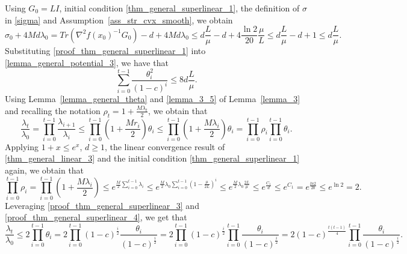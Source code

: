 \documentclass[11pt]{article}
\numberwithin{assumption}{section}
\numberwithin{remark}{section}
\numberwithin{theorem}{section}
\begin{document}
Using $G_0 = LI$, initial condition \eqref{thm_general_superlinear_1}, the definition of $\sigma$ in \eqref{sigma} and Assumption~\ref{ass_str_cvx_smooth}, we obtain
\begin{equation}\label{proof_thm_general_superlinear_1}
    \sigma_0 + 4Md\lambda_0 = Tr(\nabla^2{f(x_0)}^{-1}G_0) - d + 4Md\lambda_0 \leq d\frac{L}{\mu} - d + 4\frac{\ln{2}}{20}\frac{\mu}{L} \leq d\frac{L}{\mu} - d + 1 \leq d\frac{L}{\mu}.
\end{equation}
Substituting \eqref{proof_thm_general_superlinear_1} into \eqref{lemma_general_potential_3}, we have that
\begin{equation}\label{proof_thm_general_superlinear_2}
\sum_{i = 0}^{t - 1}\frac{\theta^2_i}{(1 - c)^i} \leq 8d\frac{L}{\mu}.
\end{equation}
Using Lemma~\ref{lemma_general_theta} and \eqref{lemma_3_5} of Lemma~\ref{lemma_3} and recalling the notation $\rho_t = 1 + \frac{M\lambda_t}{2}$, we obtain that
\begin{equation}\label{proof_thm_general_superlinear_3}
\frac{\lambda_t}{\lambda_0} = \prod_{i = 0}^{t - 1}\frac{\lambda_{i + 1}}{\lambda_i} \leq \prod_{i = 0}^{t - 1}(1 + \frac{Mr_i}{2})\theta_i \leq \prod_{i = 0}^{t - 1}(1 + \frac{M\lambda_i}{2})\theta_i = \prod_{i = 0}^{t - 1}\rho_i \prod_{i = 0}^{t - 1}\theta_i.
\end{equation}
Applying $1 + x \leq e^x$, $d \geq 1$, the linear convergence result of \eqref{thm_general_linear_3} and the initial condition \eqref{thm_general_superlinear_1} again, we obtain that
\begin{equation}\label{proof_thm_general_superlinear_4}
\prod_{i = 0}^{t - 1}\rho_i = \prod_{i = 0}^{t - 1}(1 + \frac{M\lambda_i}{2}) \leq e^{\frac{M}{2}\sum_{i = 0}^{t - 1}\lambda_i} \leq e^{\frac{M}{2}\lambda_0\sum_{i = 0}^{t - 1}(1 - \frac{\mu}{2L})^{i}} \leq e^{\frac{M}{2}\lambda_0\frac{2L}{\mu}} \leq e^{\frac{C_1}{d}} \leq e^{C_1} = e^{\frac{ln{2}}{20}} \leq e^{\ln{2}} = 2.
\end{equation}
Leveraging \eqref{proof_thm_general_superlinear_3} and \eqref{proof_thm_general_superlinear_4}, we get that
\begin{equation}\label{proof_thm_general_superlinear_5}
    \frac{\lambda_t}{\lambda_0} \leq 2\prod_{i = 0}^{t - 1}\theta_i = 2\prod_{i = 0}^{t - 1}(1 - c)^{\frac{i}{2}}\frac{\theta_i}{(1 - c)^{\frac{i}{2}}} = 2\prod_{i = 0}^{t - 1}(1 - c)^{\frac{i}{2}}\prod_{i = 0}^{t - 1}\frac{\theta_i}{(1 - c)^{\frac{i}{2}}} = 2(1 - c)^{\frac{t(t - 1)}{4}}\prod_{i = 0}^{t - 1}\frac{\theta_i}{(1 - c)^{\frac{i}{2}}}.
\end{equation}
\end{document}
